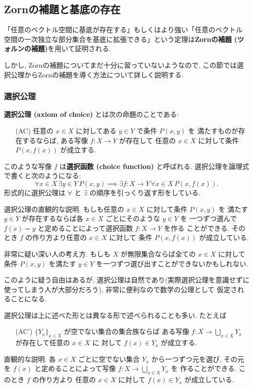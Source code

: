 \documentclass[12pt,twoside]{jarticle}
\begin{document}
\subsection{Zornの補題と基底の存在}

「任意のベクトル空間に基底が存在する」もしくはより強い「任意のベクトル
空間の一次独立な部分集合を基底に拡張できる」という定理は{\bf Zornの補題
(ツォルンの補題)}を用いて証明される.

しかし, Zornの補題についてまだ十分に習っていないようなので, 
この節では選択公理からZornの補題を導く方法について詳しく説明する.


\subsubsection{選択公理}

{\bf 選択公理 (axiom of choice)} とは次の命題のことである:
\begin{itemize}
\item[(AC)] 任意の $x\in X$ に対してある $y\in Y$ で条件 $P(x,y)$ を
  満たすものが存在するならば, 
  ある写像 $f:X\to Y$ が存在して
  任意の $x\in X$ に対して条件 $P(x,f(x))$ が成立する.
\end{itemize}
このような写像 $f$ は{\bf 選択函数 (choice function)} と呼ばれる.
選択公理を論理式で書くと次のようになる:
\begin{equation*}
  \forall x\in X\, \exists y\in Y\, P(x,y)
  \implies
  \exists f:X\to Y\, \forall x\in X\, P(x,f(x)).
\end{equation*}
形式的に選択公理は $\forall$ と $\exists$ の順序を引っくり返す形をしている.

選択公理の直観的な説明. もしも任意の $x\in X$ に対して条件 $P(x,y)$ を
満たす $y\in Y$ が存在するならば各 $x\in X$ ごとにそのような $y\in Y$ を
一つずつ選んで $f(x)=y$ と定めることによって選択函数 $f:X\to Y$ を作る
ことができる. そのとき $f$ の作り方より任意の $x\in X$ に対して
条件 $P(x,f(x))$ が成立している.

非常に疑い深い人の考え方. もしも $X$ が無限集合ならば全ての $x\in X$ に対して
条件 $P(x,y)$ を満たす $y\in Y$ を一つずつ選び出すことができないかもしれない.

このように疑う自由はあるが, 選択公理は自然であり(実際選択公理を意識せずに
使ってしまう人が大部分だろう), 非常に便利なので数学の公理として
仮定されることになる.

選択公理は上に述べた形とは異なる形で述べられることも多い. たとえば
\begin{itemize}
\item[(AC')] $\{Y_x\}_{x\in X}$ が空でない集合の集合族ならば
  ある写像 $f:X\to \bigcup_{x\in X}Y_x$ が存在して任意の $x\in X$ に
  対して $f(x)\in Y_x$ が成立する.
\end{itemize}
直観的な説明. 各 $x\in X$ ごとに空でない集合 $Y_x$ から一つずつ元を選び,
その元を $f(x)$ と定めることによって写像 $f:X\to \bigcup_{x\in X}Y_x$ を
作ることができる. このとき $f$ の作り方より
任意の $x\in X$ に対して $f(x)\in Y_x$ が成立している.
\end{document}
